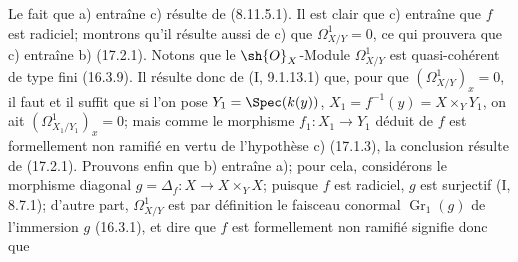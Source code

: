 Le fait que a) entraîne c) résulte de (8.11.5.1). Il est clair que c) entraîne que $f$ est radiciel; montrons qu'il résulte aussi de c) que $\Omega_{X/Y}^1=0$, ce qui prouvera que c) entraîne b) (17.2.1). Notons que le $\sh{O}_X$-Module $\Omega_{X/Y}^1$ est quasi-cohérent de type fini (16.3.9). Il résulte donc de (I, 9.1.13.1) que, pour que $(\Omega_{X/Y}^1)_x=0$, il faut et il suffit que si l'on pose $Y_1=\Spec(k(y))$, $X_1=f^{-1}(y)=X\times_Y Y_1$, on ait $(\Omega_{X_1/Y_1}^1)_x=0$; mais comme le morphisme $f_1:X_1\to Y_1$ déduit de $f$ est formellement non ramifié en vertu de l'hypothèse c) (17.1.3), la conclusion résulte de (17.2.1). Prouvons enfin que b) entraîne a); pour cela, considérons le morphisme diagonal $g=\Delta_f:X\to X\times_Y X$; puisque $f$ est radiciel, $g$ est surjectif (I, 8.7.1); d'autre part, $\Omega_{X/Y}^1$ est par définition le faisceau conormal $\mathop{Gr}\nolimits_1(g)$ de l'immersion $g$ (16.3.1), et dire que $f$ est formellement non ramifié signifie donc que

